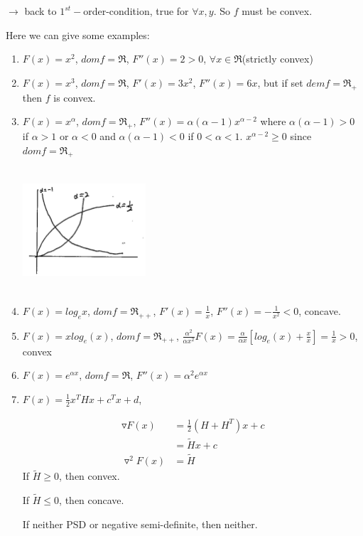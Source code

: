 $\rightarrow$ back to $1^{st}-$order-condition, true for $\forall x,y$. So $f$ must be convex. 


Here we can give some examples:

\begin{enumerate}
	\item $F(x) = x^2$, $domf = \Re$, $F''(x) = 2 > 0$, $\forall x\in \Re$(strictly convex)
	
	\item $F(x) = x^3$, $domf = \Re$, $F'(x) = 3x^2$, $F''(x) = 6x$, but if set $demf = \Re_+$ then $f$ is convex.
	
	\item $F(x) = x^{\alpha}$, $domf = \Re_+$, $F''(x) = \alpha(\alpha - 1)x^{\alpha - 2}$ where $\alpha(\alpha - 1) > 0$ if $\alpha > 1$ or $\alpha < 0$ and $\alpha(\alpha - 1) < 0$ if $0<\alpha < 1$. $x^{\alpha - 2}\geq 0$ since $domf = \Re_+$
	
	\begin{marginfigure}
	\centering
	\includegraphics[width=1.8in,height=1.8in]{figures/ch08/figure1106_4.png}
	\end{marginfigure}
	
	\item $F(x) = log_ex$, $domf = \Re_{++}$, $F'(x) = \frac{1}{x}$, $F''(x) = -\frac{1}{x^2}<0$, concave.
	
	\item $F(x) = xlog_e(x)$, $domf = \Re_{++}$, $\frac{\alpha^2}{\alpha x^2}F(x) = \frac{\alpha}{\alpha x}[log_e(x) + \frac{x}{x}] = \frac{1}{x} > 0$, convex
	
	\item $F(x) = e^{\alpha x}$, $domf = \Re$, $F''(x) = \alpha^2 e^{\alpha x}$
	
	\item $F(x) = \frac{1}{2}x^THx + c^Tx + d$, 
	
	\begin{align*}
	\triangledown F(x) &= \frac{1}{2}(H+H^T)x + c \\
	&= \tilde{H}x + c\\
	\triangledown^2F(x) &= \tilde{H}
	\end{align*}
	If $\tilde{H}\geq 0$, then convex.
	
	If $\tilde{H}\leq 0$, then concave.
	
	If neither PSD or negative semi-definite, then neither. 
\end{enumerate}

